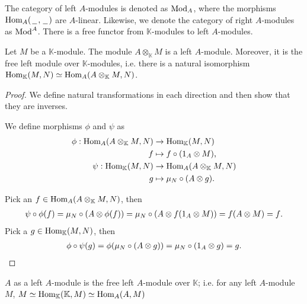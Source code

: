 \documentclass[../thesis.tex]{subfiles}
\begin{document}
                The category of left $A$-modules is denoted as $\tt{Mod}_A$, where the morphisms $\tt{Hom}_A(\argument,\argument)$ are $A$-linear. Likewise, we denote the category of right $A$-modules as $\tt{Mod}^A$. There is a free functor from $\mathbb{K}$-modules to left $A$-modules.

                \begin{proposition}\label{prop: free-mod}
                    Let $M$ be a $\mathbb{K}$-module. The module $A\otimes_{\mathbb{K}}M$ is a left $A$-module. Moreover, it is the free left module over $\mathbb{K}$-modules, i.e. there is a natural isomorphism $\tt{Hom}_{\mathbb{K}}(M,N)\simeq \tt{Hom}_{A}(A\otimes_{\mathbb{K}}M,N)$.
                \end{proposition}

                \begin{proof}
                    We define natural transformations in each direction and then show that they are inverses.

                    We define morphisms $\phi$ and $\psi$ as
                    \begin{align*}
                        \phi : \tt{Hom}_A(A\otimes_\mathbb{K}M, N) & \rightarrow \tt{Hom}_\mathbb{K}(M,N) \\
                        f & \mapsto f \circ (1_A \otimes M)\tt{,} \\
                        \psi : \tt{Hom}_\mathbb{K}(M, N) & \rightarrow \tt{Hom}_A(A\otimes_\mathbb{K}M, N) \\
                        g & \mapsto \mu_N \circ (A \otimes g)\tt{.}
                    \end{align*}

                    Pick an $f \in \tt{Hom}_A(A\otimes_\mathbb{K}M, N)$, then
                    \begin{align*}
                            \psi\circ\phi (f) = \mu_N \circ (A \otimes \phi (f)) = \mu_N \circ (A \otimes f (1_A \otimes M)) = f (A \otimes M) = f\tt{.}
                    \end{align*}
                    Pick a $g \in \tt{Hom}_\mathbb{K}(M,N)$, then
                    \begin{align*}
                        \phi\circ\psi (g) = \phi (\mu_N \circ (A \otimes g)) = \mu_N \circ (1_A \otimes g) = g\tt{.}
                    \end{align*}
                \end{proof}

                \begin{corollary}
                    $A$ as a left $A$-module is the free left $A$-module over $\mathbb{K}$; i.e. for any left $A$-module $M$, $M \simeq \tt{Hom}_\mathbb{K}(\mathbb{K}, M) \simeq \tt{Hom}_A(A,M)$
                \end{corollary}
            
\end{document}
